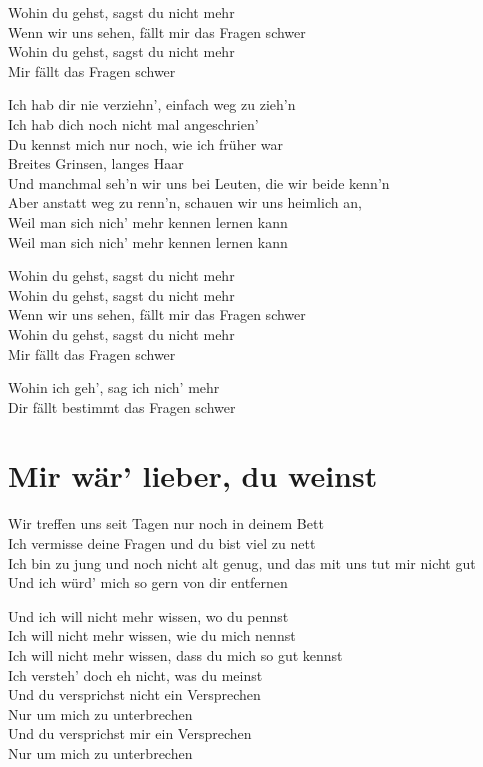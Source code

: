 \documentclass[]{book}
\begin{document}
Wohin du gehst, sagst du nicht mehr\\
Wenn wir uns sehen, fällt mir das Fragen schwer\\
Wohin du gehst, sagst du nicht mehr\\
Mir fällt das Fragen schwer

Ich hab dir nie verziehn', einfach weg zu zieh'n\\
Ich hab dich noch nicht mal angeschrien'\\
Du kennst mich nur noch, wie ich früher war\\
Breites Grinsen, langes Haar\\
Und manchmal seh'n wir uns bei Leuten, die wir beide kenn'n\\
Aber anstatt weg zu renn'n, schauen wir uns heimlich an,\\
Weil man sich nich' mehr kennen lernen kann\\
Weil man sich nich' mehr kennen lernen kann

Wohin du gehst, sagst du nicht mehr\\
Wohin du gehst, sagst du nicht mehr\\
Wenn wir uns sehen, fällt mir das Fragen schwer\\
Wohin du gehst, sagst du nicht mehr\\
Mir fällt das Fragen schwer

Wohin ich geh', sag ich nich' mehr\\
Dir fällt bestimmt das Fragen schwer

\hypertarget{mir-war-lieber-du-weinst}{%
\section{Mir wär' lieber, du weinst}\label{mir-war-lieber-du-weinst}}

Wir treffen uns seit Tagen nur noch in deinem Bett\\
Ich vermisse deine Fragen und du bist viel zu nett\\
Ich bin zu jung und noch nicht alt genug, und das mit uns tut mir nicht gut\\
Und ich würd' mich so gern von dir entfernen

Und ich will nicht mehr wissen, wo du pennst\\
Ich will nicht mehr wissen, wie du mich nennst\\
Ich will nicht mehr wissen, dass du mich so gut kennst\\
Ich versteh' doch eh nicht, was du meinst\\
Und du versprichst nicht ein Versprechen\\
Nur um mich zu unterbrechen\\
Und du versprichst mir ein Versprechen\\
Nur um mich zu unterbrechen
\end{document}
